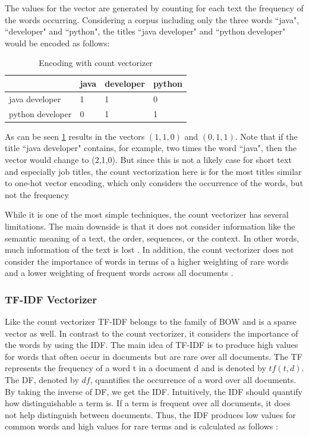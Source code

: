 \documentclass[12pt, a4paper, titlepage]{article}
\begin{document}
The values for the vector are generated by counting for each text the frequency of the words occurring. Considering a corpus including only the three words ``java", ``developer" and ``python", the titles ``java developer" and ``python developer" would be encoded as follows:


\begin{table}[hb!]
\center
  \begin{tabular}{llll}
  \hline
                   & java & developer & python \\ \hline
  java developer   & 1    & 1         & 0      \\
  python developer & 0    & 1         & 1      \\ \hline
  \end{tabular}
  \caption{\label{tab: T11} Encoding with count vectorizer}
  \end{table}


As can be seen \ref{tab: T11} results in the vectors $(1,1,0)$ and $(0,1,1)$. Note that if the title ``java developer" contains, for example, two times the word ``java", then the vector would change to (2,1,0). But since this is not a likely case for short text and especially job titles, the count vectorization here is for the most titles similar to one-hot vector encoding, which only considers the occurrence of the words, but not the frequency \citep{kulkarni2021, sarkar2016}

  While it is one of the most simple techniques, the count vectorizer has several limitations. The main downside is that it does not consider information like the semantic meaning of a text, the order, sequences, or the context. In other words, much information of the text is lost \citep{sarkar2016}. In addition, the count vectorizer does not consider the importance of words in terms of a higher weighting of rare words and a lower weighting of frequent words across all documents \citep{suleymanov2019}.

\subsubsection*{TF-IDF Vectorizer}
Like the count vectorizer \ac{TF-IDF} belongs to the family of \ac{BOW} and is a sparse vector as well. In contrast to the count vectorizer, it considers the importance of the words by using the \ac{IDF}. The main idea of \ac{TF-IDF} is to produce high values for words that often occur in documents but are rare over all documents. The \ac{TF} represents the frequency of a word t in a document d and is denoted by $tf(t,d)$. The \ac{DF}, denoted by $df$, quantifies the occurrence of a word over all documents. By taking the inverse of \ac{DF}, we get the \ac{IDF}. Intuitively, the \ac{IDF} should quantify how distinguishable a term is. If a term is frequent over all documents, it does not help distinguish between documents. Thus, the \ac{IDF} produces low values for common words and high values for rare terms and is calculated as follows \citep{sidorov2019, kuang2010}: 
\end{document}
